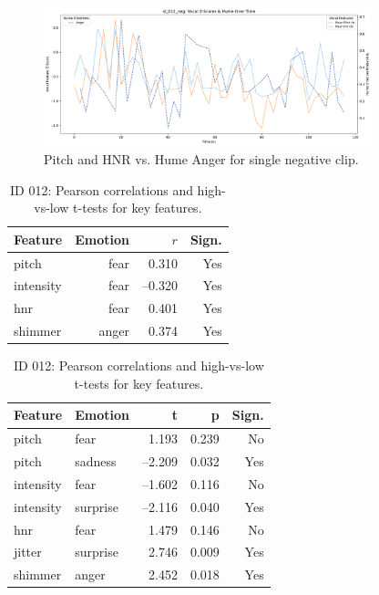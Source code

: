 \begin{figure}[H]
    \centering
    \includegraphics[width=0.85\textwidth]{png/results/rq3_2/combined_zscore_hume_id_012_neg_6.pdf} 
    \caption{Pitch and HNR vs. Hume Anger for single negative clip.}
    \label{fig:006_pos-surp-sadn}
\end{figure}
    



\begin{table}[H]
    \centering
    \begin{subtable}{0.45\textwidth}
      \centering
      \caption{Correlation (ID 012)}\label{tab:id012_corr}
      \begin{tabular}{l r r r}
        \toprule
        \textbf{Feature} & \textbf{Emotion} & \textbf{\(r\)} & \textbf{Sign.} \\
        \midrule
        pitch     & fear        &  0.310 & Yes \\
        intensity & fear        & –0.320 & Yes \\
        hnr       & fear        &  0.401 & Yes \\
        shimmer      & anger       &  0.374 & Yes \\
        \bottomrule
      \end{tabular}
    \end{subtable}\hfill
    \begin{subtable}{0.45\textwidth}
      \centering
      \caption{High vs Low T-Test (ID 012)}\label{tab:id012_ttest}
      \begin{tabular}{l l r r r}
        \toprule
        \textbf{Feature} & \textbf{Emotion} & \textbf{t} & \textbf{p} & \textbf{Sign.} \\
        \midrule
        pitch     & fear      &  1.193 & 0.239  & No  \\
        pitch     & sadness   & –2.209 & 0.032  & Yes \\
        intensity & fear      & –1.602 & 0.116  & No  \\
        intensity & surprise  & –2.116 & 0.040  & Yes \\
        hnr       & fear      &  1.479 & 0.146  & No  \\
        jitter       & surprise  &  2.746 & 0.009  & Yes \\
        shimmer      & anger     &  2.452 & 0.018  & Yes \\
        \bottomrule
      \end{tabular}
    \end{subtable}
  
    \caption{ID 012: Pearson correlations and high-vs-low t-tests for key features.}
    \label{tab:id012_summary}
  \end{table}

